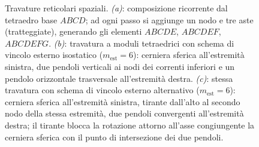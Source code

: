 \begin{figure}[!htbp]
{}
	\caption{Travature reticolari spaziali.
		\emph{(a)}: composizione ricorrente dal tetraedro
		base $ABCD$; ad ogni passo si aggiunge un nodo
		e tre aste (tratteggiate), generando gli elementi
		$ABCDE$, $ABCDEF$, $ABCDEFG$.
		\emph{(b)}: travatura a moduli tetraedrici con
		schema di vincolo esterno isostatico ($m_{\text{est}} = 6$):
		cerniera sferica all'estremità sinistra, due pendoli
		verticali ai nodi dei correnti inferiori e un pendolo
		orizzontale trasversale all'estremità destra.
		\emph{(c)}: stessa travatura con schema di vincolo
		esterno alternativo ($m_{\text{est}} = 6$): cerniera
		sferica all'estremità sinistra, tirante dall'alto al
		secondo nodo della stessa estremità, due pendoli
		convergenti all'estremità destra; il tirante blocca
		la rotazione attorno all'asse congiungente la cerniera
		sferica con il punto di intersezione dei due pendoli.}
	\label{fig:reticolari_spaz}
\end{figure}

